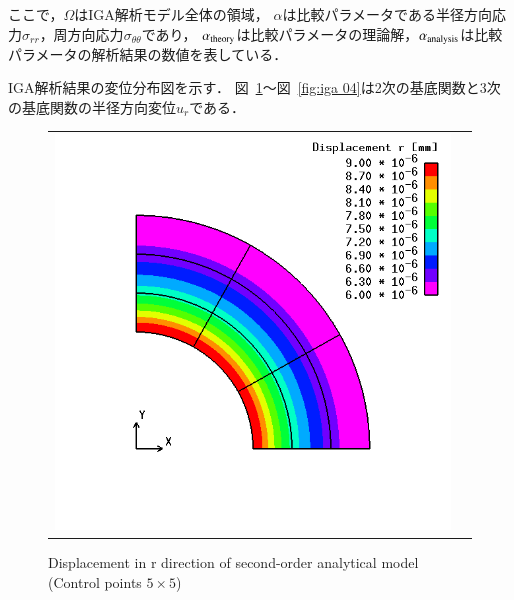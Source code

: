 \noindent
ここで，$\Omega$はIGA解析モデル全体の領域，
$\alpha$は比較パラメータである半径方向応力$\sigma_{rr}$，周方向応力$\sigma_{\theta\theta}$であり，
$\alpha_{\rm{theory}}$は比較パラメータの理論解，$\alpha_{\rm{analysis}}$は比較パラメータの解析結果の数値を表している．

\newpage

IGA解析結果の変位分布図を示す．
図~\ref{fig:iga 01}～図~\ref{fig:iga 04}は2次の基底関数と3次の基底関数の半径方向変位$u_{r}$である．

\begin{figure}[htbp]
  \begin{tabular}{cc}
    \begin{minipage}[t]{0.45\hsize}
      \centering
      \includegraphics[keepaspectratio, scale=0.3]
      {fig/result_data_etc/iga/order2/2_5x5.png}
      \caption{Displacement in r direction of second-order analytical model (Control points $5\times 5$)}
      \label{fig:iga 01}
    \end{minipage} &
    \begin{minipage}[t]{0.45\hsize}
      \centering

\end{minipage}
\end{tabular}
\end{figure}
